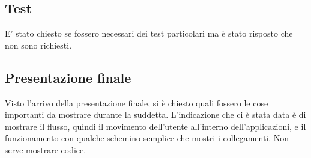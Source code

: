 \subsection{Test}
E' stato chiesto se fossero necessari dei test particolari ma è stato risposto che non sono richiesti.

\subsection{Presentazione finale}
Visto l'arrivo della presentazione finale, si è chiesto quali fossero le cose importanti da mostrare durante la suddetta. L'indicazione che ci è stata data è di mostrare il flusso, quindi il movimento dell'utente all'interno dell'applicazioni, e il funzionamento con qualche schemino semplice che mostri i collegamenti. Non serve mostrare codice. 

\pagebreak
